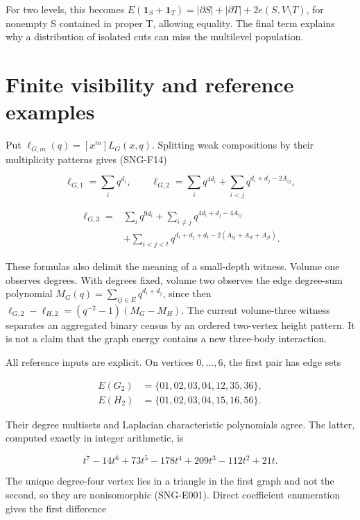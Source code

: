 \documentclass[
  11pt,
  a4paper,
]{article}
\begin{document}
For two levels, this becomes
\(E(\mathbf1_S+\mathbf1_T)=|\partial S|+|\partial T|+2e(S,V\setminus T)\),
for nonempty S contained in proper T, allowing equality. The final term
explains why a distribution of isolated cuts can miss the multilevel
population.

\hypertarget{finite-visibility-and-reference-examples}{%
\section{Finite visibility and reference
examples}\label{finite-visibility-and-reference-examples}}

Put \(\ell_{G,m}(q)=[x^m]L_G(x,q)\). Splitting weak compositions by
their multiplicity patterns gives (SNG-F14)

\[
 \ell_{G,1}=\sum_iq^{d_i},\qquad
 \ell_{G,2}=\sum_iq^{4d_i}+\sum_{i<j}q^{d_i+d_j-2A_{ij}},
\]

\[
 \begin{aligned}
 \ell_{G,3}={}&\sum_iq^{9d_i}
 +\sum_{i\ne j}q^{4d_i+d_j-4A_{ij}}\\
 &+\sum_{i<j<t}q^{d_i+d_j+d_t-2(A_{ij}+A_{it}+A_{jt})}.
 \end{aligned}
\]

These formulas also delimit the meaning of a small-depth witness. Volume
one observes degrees. With degrees fixed, volume two observes the edge
degree-sum polynomial \(M_G(q)=\sum_{ij\in E}q^{d_i+d_j}\), since then
\(\ell_{G,2}-\ell_{H,2}=(q^{-2}-1)(M_G-M_H)\). The current volume-three
witness separates an aggregated binary census by an ordered two-vertex
height pattern. It is not a claim that the graph energy contains a new
three-body interaction.

All reference inputs are explicit. On vertices \(0,\ldots,6\), the first
pair has edge sets

\[
 \begin{aligned}
 E(G_2)&=\{01,02,03,04,12,35,36\},\\
 E(H_2)&=\{01,02,03,04,15,16,56\}.
 \end{aligned}
\]

Their degree multisets and Laplacian characteristic polynomials agree.
The latter, computed exactly in integer arithmetic, is

\[
 t^7-14t^6+73t^5-178t^4+209t^3-112t^2+21t.
\]

The unique degree-four vertex lies in a triangle in the first graph and
not the second, so they are nonisomorphic (SNG-E001). Direct coefficient
enumeration gives the first difference
\end{document}
